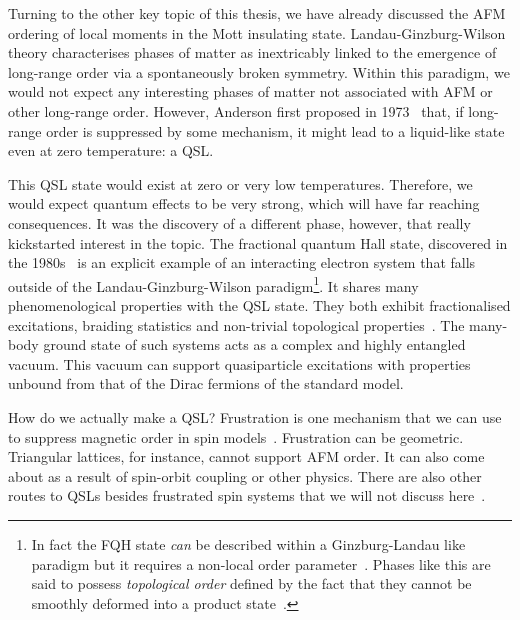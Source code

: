 Turning to the other key topic of this thesis, we have already discussed the AFM ordering of local moments in the Mott insulating state. Landau-Ginzburg-Wilson theory characterises phases of matter as inextricably linked to the emergence of long-range order via a spontaneously broken symmetry. Within this paradigm, we would not expect any interesting phases of matter not associated with AFM or other long-range order. However, Anderson first proposed in 1973~\autocite{andersonResonatingValenceBonds1973} that, if long-range order is suppressed by some mechanism, it might lead to a liquid-like state even at zero temperature: a QSL.

This QSL state would exist at zero or very low temperatures. Therefore, we would expect quantum effects to be very strong, which will have far reaching consequences. It was the discovery of a different phase, however, that really kickstarted interest in the topic. The fractional quantum Hall state, discovered in the 1980s~\autocite{laughlinAnomalousQuantumHall1983} is an explicit example of an interacting electron system that falls outside of the Landau-Ginzburg-Wilson paradigm\footnote{In fact the FQH state \emph{can} be described within a Ginzburg-Landau like paradigm but it requires a non-local order parameter~\autocite{girvinOffdiagonalLongrangeOrder1987,readOrderParameterGinzburgLandau1989}. Phases like this are said to possess \emph{topological order} defined by the fact that they cannot be smoothly deformed into a product state~\autocite{chenLocalUnitaryTransformation2010,wenQuantumOrdersSymmetric2002}.}. It shares many phenomenological properties with the QSL state. They both exhibit fractionalised excitations, braiding statistics and non-trivial topological properties~\autocite{broholmQuantumSpinLiquids2020}. The many-body ground state of such systems acts as a complex and highly entangled vacuum. This vacuum can support quasiparticle excitations with properties unbound from that of the Dirac fermions of the standard model.

How do we actually make a QSL? Frustration is one mechanism that we can use to suppress magnetic order in spin models~\autocite{TrebstPhysRep2022}. Frustration can be geometric. Triangular lattices, for instance, cannot support AFM order. It can also come about as a result of spin-orbit coupling or other physics. There are also other routes to QSLs besides frustrated spin systems that we will not discuss here~\autocite{balentsNodalLiquidTheory1998,balentsDualOrderParameter1999,linExactSymmetryWeaklyinteracting1998}.

